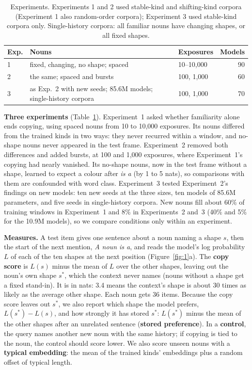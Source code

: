 \documentclass[11pt]{article}
\begin{document}
\begin{table}[t]
\centering
\small
\setlength{\tabcolsep}{2.5pt}
\begin{tabular}{@{}l>{\raggedright\arraybackslash}p{}lr@{}}
\toprule
Exp. & Nouns & Exposures & Models \\
\midrule
1 & fixed, changing, no shape; spaced & 10--10,000 & 90 \\
2 & the same; spaced and bursts & 100, 1,000 & 60 \\
3 & as Exp.~2 with new seeds; 85.6M models; single-history corpora & 100, 1,000 & 70 \\
\bottomrule
\end{tabular}
\caption{Experiments. Experiments 1 and 2 used stable-kind and shifting-kind corpora (Experiment 1 also random-order corpora); Experiment 3 used stable-kind corpora only. Single-history corpora: all familiar nouns have changing shapes, or all fixed shapes.}
\label{tab:exps}
\end{table}

\textbf{Three experiments} (Table~\ref{tab:exps}). Experiment~1 asked whether familiarity alone ends copying, using spaced nouns from 10 to 10,000 exposures. Its nouns differed from the trained kinds in two ways: they never recurred within a window, and no-shape nouns never appeared in the test frame. Experiment~2 removed both differences and added bursts, at 100 and 1,000 exposures, where Experiment~1's copying had nearly vanished. Its no-shape nouns, now in the test frame without a shape, learned to expect a colour after \emph{is a} (by 1 to 5 nats), so comparisons with them are confounded with word class. Experiment~3 tested Experiment~2's findings on new models: ten new seeds at the three sizes, ten models of 85.6M parameters, and five seeds in single-history corpora. New nouns fill about 60\% of training windows in Experiment~1 and 8\% in Experiments~2 and~3 (40\% and 5\% for the 10.9M models), so we compare conditions only within an experiment.

\textbf{Measures.} A test item gives one sentence about a noun naming a shape $s$, then the start of the next mention, \emph{A \textit{noun} is a}, and reads the model's log probability $L$ of each of the ten shapes at the next position (Figure~\ref{fig:1}a). The \textbf{copy score} is $L(s)$ minus the mean of $L$ over the other shapes, leaving out the noun's own shape $s^*$, which the context never names (nouns without a shape get a fixed stand-in). It is in nats: 3.4 means the context's shape is about 30 times as likely as the average other shape. Each noun gets 36 items. Because the copy score leaves out $s^*$, we also report which shape the model prefers, $L(s^*) - L(s)$, and how strongly it has stored $s^*$: $L(s^*)$ minus the mean of the other shapes after an unrelated sentence (\textbf{stored preference}). In a \textbf{control}, the query names another new noun with the same history; if copying is tied to the noun, the control should score lower. We also score unseen nouns with a \textbf{typical embedding}: the mean of the trained kinds' embeddings plus a random offset of typical length.
\end{document}
